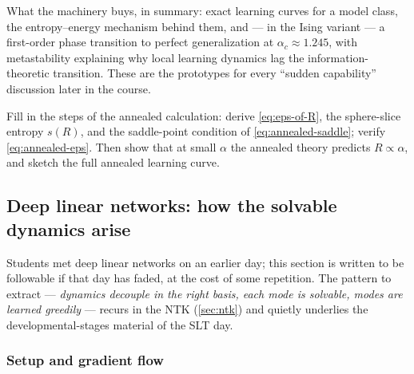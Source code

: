 \documentclass[11pt]{article}
\begin{document}
\begin{callout}[tip]
What the machinery buys, in summary: exact learning curves for a model
class, the entropy--energy mechanism behind them, and --- in the Ising
variant --- a first-order phase transition to perfect generalization at
$\alpha_c \approx 1.245$, with metastability explaining why local learning
dynamics lag the information-theoretic transition. These are the prototypes
for every ``sudden capability'' discussion later in the course.
\end{callout}

\begin{exercise}
\label{ex:annealed}
Fill in the steps of the annealed calculation: derive
\cref{eq:eps-of-R}, the sphere-slice entropy $s(R)$, and the saddle-point
condition of \cref{eq:annealed-saddle}; verify
\cref{eq:annealed-eps}. Then show that at small $\alpha$ the annealed theory
predicts $R \propto \alpha$, and sketch the full annealed learning curve.
\end{exercise}

\subsection{Deep linear networks: how the solvable dynamics arise}
\label{sec:dln}

Students met deep linear networks on an earlier day; this section is
written to be followable if that day has faded, at the cost of some
repetition. The pattern to extract --- \emph{dynamics decouple in the right
basis, each mode is solvable, modes are learned greedily} --- recurs in the
NTK (\cref{sec:ntk}) and quietly underlies the developmental-stages
material of the SLT day.

\subsubsection{Setup and gradient flow}
\end{document}

